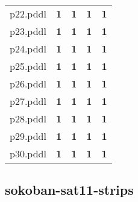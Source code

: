 \documentclass{article}
\begin{document}
\begin{tabular}{@{}lrrrr@{}}
p22.pddl & \textbf{1} & \textbf{1} & \textbf{1} & \textbf{1} \\
p23.pddl & \textbf{1} & \textbf{1} & \textbf{1} & \textbf{1} \\
p24.pddl & \textbf{1} & \textbf{1} & \textbf{1} & \textbf{1} \\
p25.pddl & \textbf{1} & \textbf{1} & \textbf{1} & \textbf{1} \\
p26.pddl & \textbf{1} & \textbf{1} & \textbf{1} & \textbf{1} \\
p27.pddl & \textbf{1} & \textbf{1} & \textbf{1} & \textbf{1} \\
p28.pddl & \textbf{1} & \textbf{1} & \textbf{1} & \textbf{1} \\
p29.pddl & \textbf{1} & \textbf{1} & \textbf{1} & \textbf{1} \\
p30.pddl & \textbf{1} & \textbf{1} & \textbf{1} & \textbf{1} \\
\end{tabular}

\hypertarget{coverage-sokoban-sat11-strips}{}
\subsection*{sokoban-sat11-strips}
\end{document}
